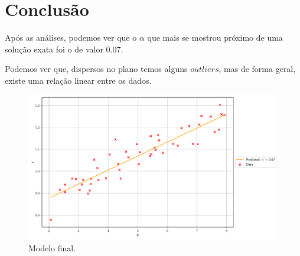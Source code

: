 \documentclass[a4paper, 12pt]{article}
\begin{document}
\section{Conclusão}
Após as análises, podemos ver que o $\alpha$ que mais se mostrou próximo de uma solução exata foi o de valor $0.07$.

Podemos ver que, dispersos no plano temos alguns $outliers$, mas de forma geral, existe uma relação linear entre os dados.
\begin{figure}[!h]
    \centering
    \includegraphics[width=1\textwidth]{../imgs/FINAL_predicted.pdf}
    \caption{Modelo final.}
    \label{fig:FINAL_predicted}
\end{figure}
\end{document}
